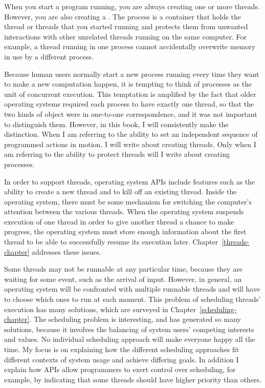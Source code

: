 When you start a program running, you are always creating one or more
threads.  However, you are also creating a .  The process is a
container that holds the thread or threads that you started running and
protects them from unwanted interactions with other unrelated
threads running on the same computer.  For example, a thread running
in one process cannot accidentally overwrite memory in use by a
different process.

Because human users normally start a new process running every time
they want to make a new computation happen, it is tempting to think of
processes as the unit of concurrent execution.  This temptation is
amplified by the fact that older operating systems required each
process to have exactly one thread, so that the two kinds of object
were in one-to-one correspondence, and it was not important to
distinguish them.  However, in this book, I will consistently make
the distinction.  When I am referring to the ability to set an
independent sequence of programmed actions in motion, I will write
about creating threads.  Only when I am referring to the ability to
protect threads will I write about creating processes.

In order to support threads, operating system APIs include features
such as the ability to create a new thread and to kill off an
existing thread.  Inside the operating system, there must be some
mechanism for switching the computer's attention between the various
threads.  When the operating system suspends execution of one thread
in order to give another thread a chance to make progress, the
operating system must store enough information about the first thread
to be able to successfully resume its execution later.
Chapter~\ref{threads-chapter} addresses these issues.

Some threads may not be runnable at any particular time, because they
are waiting for some event, such as the arrival of input.  However, in
general, an operating system will be confronted with multiple runnable
threads and will have to choose which ones to run at each
moment.  This problem of scheduling threads' execution has many
solutions, which are surveyed in Chapter~\ref{scheduling-chapter}.
The scheduling problem is interesting, and has generated
so many solutions, because it involves the balancing of system
users' competing interests and values.  No individual scheduling approach
will make everyone happy all the time.  My focus is on explaining how
the different scheduling approaches fit different contexts of system
usage and achieve differing goals.  In addition I explain how APIs allow
programmers to exert control over scheduling, for example, by
indicating that some threads should have higher priority than others.

